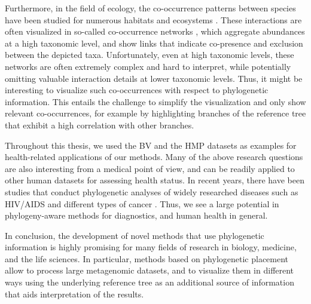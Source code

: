 Furthermore, in the field of ecology, the co-occurrence patterns between species
have been studied for numerous habitats and ecosystems \cite{Lima-Mendez2015,Villalobos2017,Zelezniak2015}.
These interactions are often visualized in so-called co-occurrence networks \cite{Chaffron2010,Faust2012},
which aggregate abundances at a high taxonomic level,
and show links that indicate co-presence and exclusion between the depicted taxa.
Unfortunately, even at high taxonomic levels, these networks are often extremely complex and hard to interpret,
while potentially omitting valuable interaction details at lower taxonomic levels.
Thus, it might be interesting to visualize such co-occurrences with respect to phylogenetic information.
This entails the challenge to simplify the visualization and only show relevant co-occurrences,
for example by highlighting branches of the reference tree that exhibit a high correlation with other branches.

Throughout this thesis, we used the \acf{BV} \cite{Srinivasan2012} and the \acf{HMP} \citep{Huttenhower2012,Methe2012}
datasets as examples for health-related applications of our methods.
Many of the above research questions are also interesting from a medical point of view,
and can be readily applied to other human datasets for assessing health status.
In recent years, there have been studies that conduct phylogenetic analyses of widely researched diseases
such as HIV/AIDS \cite{Castro-Nallar2012,Brenner2013} and different types of cancer \cite{Brown2017a,Abbosh2017}.
Thus, we see a large potential in phylogeny-aware methods for diagnostics, and human health in general.

In conclusion, the development of novel methods that use phylogenetic information
is highly promising for many fields of research in biology, medicine, and the life sciences.
In particular, methods based on phylogenetic placement allow to process large metagenomic datasets,
and to visualize them in different ways using the underlying reference tree as an additional source
of information that aids interpretation of the results.
